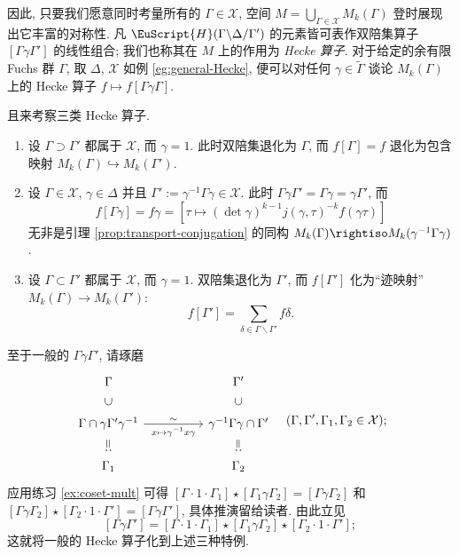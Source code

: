 因此, 只要我们愿意同时考量所有的 $\Gamma \in \mathcal{X}$, 空间 $M = \bigcup_{\Gamma \in \mathcal{X}} M_k(\Gamma)$ 登时展现出它丰富的对称性. 凡 $\EuScript{H}(\Gamma \backslash \Delta / \Gamma')$ 的元素皆可表作双陪集算子 $[\Gamma\gamma\Gamma']$ 的线性组合; 我们也称其在 $M$ 上的作用为 \emph{Hecke 算子}. 对于给定的余有限 Fuchs 群 $\Gamma$, 取 $\Delta$, $\mathcal{X}$ 如例 \ref{eg:general-Hecke}, 便可以对任何 $\gamma \in \widetilde{\Gamma}$ 谈论 $M_k(\Gamma)$ 上的 Hecke 算子 $f \mapsto f[\Gamma\gamma\Gamma]$. 

且来考察三类 Hecke 算子.
\begin{enumerate}
	\item 设 $\Gamma \supset \Gamma'$ 都属于 $\mathcal{X}$, 而 $\gamma = 1$. 此时双陪集退化为 $\Gamma$, 而 $f[\Gamma] = f$ 退化为包含映射 $M_k(\Gamma) \hookrightarrow M_k(\Gamma')$.
	\item 设 $\Gamma \in \mathcal{X}$, $\gamma \in \Delta$ 并且 $\Gamma' := \gamma^{-1}\Gamma\gamma \in \mathcal{X}$. 此时 $\Gamma\gamma\Gamma' = \Gamma \gamma = \gamma\Gamma'$, 而
		\[ f[\Gamma\gamma] = f \gamma = \left[ \tau \mapsto (\det\gamma)^{k-1} j(\gamma,\tau)^{-k} f(\gamma\tau) \right] \]
		无非是引理 \ref{prop:transport-conjugation} 的同构 $M_k(\Gamma) \rightiso M_k(\gamma^{-1}\Gamma\gamma)$.
	\item 设 $\Gamma \subset \Gamma'$ 都属于 $\mathcal{X}$, 而 $\gamma=1$. 双陪集退化为 $\Gamma'$, 而 $f[\Gamma']$ 化为``迹映射'' $M_k(\Gamma) \to M_k(\Gamma')$:
		\[ f[\Gamma'] = \sum_{\delta \in \Gamma \backslash \Gamma'} f \delta. \]
\end{enumerate}

至于一般的 $\Gamma\gamma\Gamma'$, 请琢磨
\[\begin{tikzcd}
	\Gamma \arrow[phantom, d, "\supset" sloped] & & \Gamma' \arrow[phantom, d, "\supset" sloped] \\
	\Gamma \cap \gamma \Gamma' \gamma^{-1} \arrow[rr, "\sim", "x \mapsto \gamma^{-1}x\gamma"'] & & \gamma^{-1}\Gamma\gamma \cap \Gamma' \\
	\Gamma_1 \arrow[phantom, u, ":=" sloped] & & \Gamma_2 \arrow[phantom, u, ":=" sloped]
\end{tikzcd} \quad (\Gamma, \Gamma', \Gamma_1, \Gamma_2 \in \mathcal{X}) ; \]
应用练习 \ref{ex:coset-mult} 可得 $[\Gamma \cdot 1 \cdot \Gamma_1] \star [\Gamma_1 \gamma \Gamma_2] = [\Gamma \gamma \Gamma_2]$ 和 $[\Gamma \gamma \Gamma_2] \star [\Gamma_2 \cdot 1 \cdot \Gamma'] = [\Gamma \gamma \Gamma']$, 具体推演留给读者. 由此立见
\begin{equation}\label{eqn:Hecke-op-decomp}
	[\Gamma\gamma\Gamma'] = [\Gamma \cdot 1 \cdot \Gamma_1] \star [\Gamma_1 \gamma \Gamma_2] \star [\Gamma_2 \cdot 1 \cdot \Gamma'];
\end{equation}
这就将一般的 Hecke 算子化到上述三种特例.

